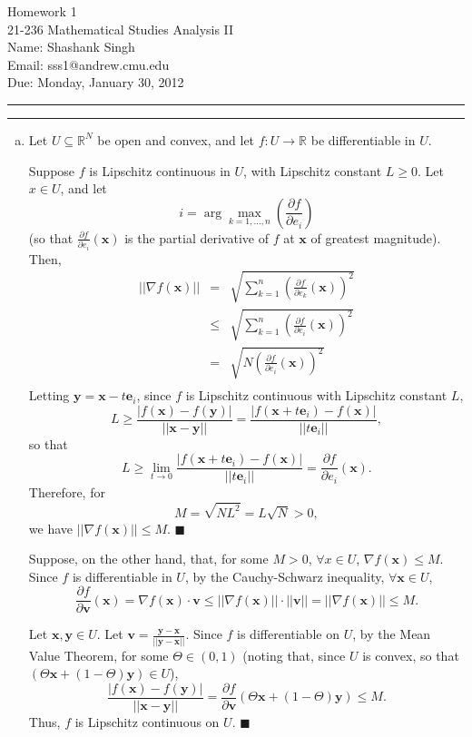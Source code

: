 \documentclass[11pt]{article}
\makeatletter
\newcounter{questionCounter}
\newcounter{partCounter}[questionCounter]
\newenvironment{question}[2][\arabic{questionCounter}]{%
    \setcounter{partCounter}{0}%
    \vspace{.25in} \hrule \vspace{0.5em}%
        \noindent{\bf #2}%
    \vspace{0.8em} \hrule \vspace{.10in}%
    \addtocounter{questionCounter}{1}%
}{}
\newcommand{\myname}{Shashank Singh}
\newcommand{\myandrew}{sss1@andrew.cmu.edu}
\newcommand{\myclass}{21-236 Mathematical Studies Analysis II}
\newcommand{\myhwnum}{1}
\newcommand{\duedate}{Monday, January 30, 2012}
\makeatother
\begin{document}
\thispagestyle{plain}

{\Large Homework \myhwnum} \\
\myclass \\
Name: \myname \\
Email: \myandrew \\
Due: \duedate
\begin{question}{Problem 1}
\begin{enumerate}[(a)]
\item Let $U \subseteq \mathbb{R}^N$ be open and convex, and let
$f: U \rightarrow \mathbb{R}$ be differentiable in $U$.

Suppose $f$ is Lipschitz continuous in $U$, with Lipschitz constant $L \geq 0$.
Let $x \in U$, and let
\[i = \arg \max_{k = 1, \ldots, n} \left( \frac{\partial{f}}{\partial e_i} \right)\]
(so that $\frac{\partial{f}}{\partial e_i} (\mathbf{x})$ is the partial
derivative of $f$ at $\mathbf{x}$ of greatest magnitude).
Then,
\begin{eqnarray*}
||\nabla{f(\mathbf{x})}||
 & = & \sqrt{\sum_{k = 1}^n \left(\frac{\partial{f}}{\partial e_k} (\mathbf{x})\right)^2} \\
 & \leq & \sqrt{\sum_{k = 1}^n \left(\frac{\partial{f}}{\partial e_i} (\mathbf{x})\right)^2} \\
 & = & \sqrt{N \left(\frac{\partial{f}}{\partial e_i} (\mathbf{x})\right)^2} \\
\end{eqnarray*}
Letting $\mathbf{y} = \mathbf{x} - t\mathbf{e}_i$, since $f$ is Lipschitz
continuous with Lipschitz constant $L$,
\[L \geq \frac{|f(\mathbf{x}) - f(\mathbf{y})|}{||\mathbf{x} - \mathbf{y}||}
 = \frac{|f(\mathbf{x} + t\mathbf{e}_i) - f(\mathbf{x})|}{||t\mathbf{e}_i||},\]
so that
\[L \geq \lim_{t \rightarrow 0} \frac{|f(\mathbf{x} + t\mathbf{e}_i) - f(\mathbf{x})|}{||t\mathbf{e}_i||}
 = \frac{\partial{f}}{\partial e_i} (\mathbf{x}).\]
Therefore, for
\[M = \sqrt{N L^2} = L \sqrt{N} > 0,\] we have $||\nabla{f(\mathbf{x})}|| \leq M$. \qquad $\blacksquare$

Suppose, on the other hand, that, for some $M > 0$, $\forall x \in U$,
$\nabla f(\mathbf{x}) \leq M$. 
Since $f$ is differentiable in $U$, by the Cauchy-Schwarz inequality, $\forall \mathbf{x} \in U$,
\[\frac{\partial f}{\partial \mathbf{v}} (\mathbf{x})
 = \nabla f (\mathbf{x}) \cdot \mathbf{v}
 \leq ||\nabla f (\mathbf{x})|| \cdot ||\mathbf{v}||
 = ||\nabla f (\mathbf{x})|| \leq M. \]

Let $\mathbf{x}, \mathbf{y} \in U$. Let
$\mathbf{v} = \frac{\mathbf{y} - \mathbf{x}}{||\mathbf{y} - \mathbf{x}||}$.
Since $f$ is differentiable on $U$, by the Mean Value Theorem, for some
$\Theta \in (0,1)$ (noting that, since $U$ is convex, so that
$(\Theta \mathbf{x} + (1 - \Theta) \mathbf{y}) \in U$),
\[\frac{|f(\mathbf{x}) - f(\mathbf{y})|}{||\mathbf{x} - \mathbf{y}||}
 = \frac{\partial f}{\partial \mathbf{v}} (\Theta \mathbf{x} + (1 - \Theta) \mathbf{y})
 \leq M.\]
Thus, $f$ is Lipschitz continuous on $U$. \qquad $\blacksquare$


\end{enumerate}
\end{question}
\end{document}

